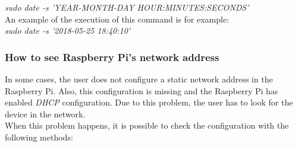 \textit{sudo date -s 'YEAR-MONTH-DAY HOUR:MINUTES:SECONDS'}\\

An example of the execution of this command is for example:\\

\textit{sudo date -s '2018-05-25 18:40:10'}

\subsubsection{How to see Raspberry Pi’s network address}

In some cases, the user does not configure a static network address in the Raspberry Pi. Also, this configuration is missing and the Raspberry Pi has enabled \textit{DHCP} configuration. Due to this problem, the user has to look for the device in the network.\\

When this problem happens, it is possible to check the configuration with the following methods:

